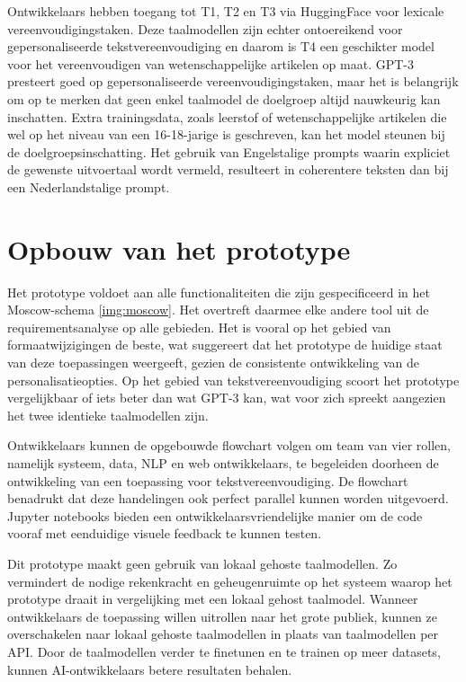 \medspace

Ontwikkelaars hebben toegang tot T1, T2 en T3 via HuggingFace voor lexicale vereenvoudigingstaken. Deze taalmodellen zijn echter ontoereikend voor gepersonaliseerde tekstvereenvoudiging en daarom is T4 een geschikter model voor het vereenvoudigen van wetenschappelijke artikelen op maat. GPT-3 presteert goed op gepersonaliseerde vereenvoudigingstaken, maar het is belangrijk om op te merken dat geen enkel taalmodel de doelgroep altijd nauwkeurig kan inschatten. Extra trainingsdata, zoals leerstof of wetenschappelijke artikelen die wel op het niveau van een 16-18-jarige is geschreven, kan het model steunen bij de doelgroepsinschatting. Het gebruik van Engelstalige prompts waarin expliciet de gewenste uitvoertaal wordt vermeld, resulteert in coherentere teksten dan bij een Nederlandstalige prompt.

\section{Opbouw van het prototype}

Het prototype voldoet aan alle functionaliteiten die zijn gespecificeerd in het Moscow-schema \ref{img:moscow}. Het overtreft daarmee elke andere tool uit de requirementsanalyse op alle gebieden. Het is vooral op het gebied van formaatwijzigingen de beste, wat suggereert dat het prototype de huidige staat van deze toepassingen weergeeft, gezien de consistente ontwikkeling van de personalisatieopties. Op het gebied van tekstvereenvoudiging scoort het prototype vergelijkbaar of iets beter dan wat GPT-3 kan, wat voor zich spreekt aangezien het twee identieke taalmodellen zijn.

\medspace

Ontwikkelaars kunnen de opgebouwde flowchart volgen om team van vier rollen, namelijk systeem, data, NLP en web ontwikkelaars, te begeleiden doorheen de ontwikkeling van een toepassing voor tekstvereenvoudiging. De flowchart benadrukt dat deze handelingen ook perfect parallel kunnen worden uitgevoerd. Jupyter notebooks bieden een ontwikkelaarsvriendelijke manier om de code vooraf met eenduidige visuele feedback te kunnen testen.

\medspace

Dit prototype maakt geen gebruik van lokaal gehoste taalmodellen. Zo vermindert de nodige rekenkracht en geheugenruimte op het systeem waarop het prototype draait in vergelijking met een lokaal gehost taalmodel. Wanneer ontwikkelaars de toepassing willen uitrollen naar het grote publiek, kunnen ze overschakelen naar lokaal gehoste taalmodellen in plaats van taalmodellen per API. Door de taalmodellen verder te finetunen en te trainen op meer datasets, kunnen AI-ontwikkelaars betere resultaten behalen. 

